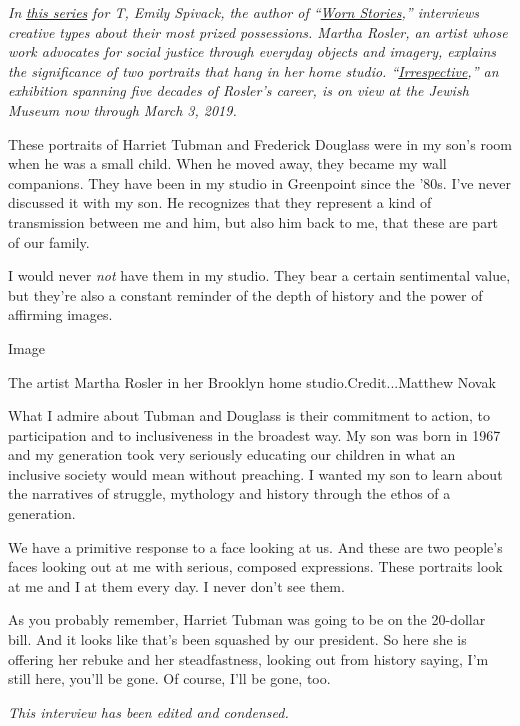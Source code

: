 \emph{In}
\href{https://www.nytimes3xbfgragh.onion/column/story-of-a-thing}{\emph{this
series}} \emph{for T, Emily Spivack, the author of
``}\href{http://wornstories.com/}{\emph{Worn Stories}}\emph{,''
interviews creative types about their most prized possessions. Martha
Rosler, an artist whose work advocates for social justice through
everyday objects and imagery, explains the significance of two portraits
that hang in her home studio.
``}\href{https://thejewishmuseum.org/index.php/exhibitions/martha-rosler-irrespective}{\emph{Irrespective}}\emph{,''
an exhibition spanning five decades of Rosler's career, is on view at
the Jewish Museum now through March 3, 2019.}

These portraits of Harriet Tubman and Frederick Douglass were in my
son's room when he was a small child. When he moved away, they became my
wall companions. They have been in my studio in Greenpoint since the
'80s. I've never discussed it with my son. He recognizes that they
represent a kind of transmission between me and him, but also him back
to me, that these are part of our family.

I would never \emph{not} have them in my studio. They bear a certain
sentimental value, but they're also a constant reminder of the depth of
history and the power of affirming images.

Image

The artist Martha Rosler in her Brooklyn home studio.Credit...Matthew
Novak

What I admire about Tubman and Douglass is their commitment to action,
to participation and to inclusiveness in the broadest way. My son was
born in 1967 and my generation took very seriously educating our
children in what an inclusive society would mean without preaching. I
wanted my son to learn about the narratives of struggle, mythology and
history through the ethos of a generation.

We have a primitive response to a face looking at us. And these are two
people's faces looking out at me with serious, composed expressions.
These portraits look at me and I at them every day. I never don't see
them.

As you probably remember, Harriet Tubman was going to be on the
20-dollar bill. And it looks like that's been squashed by our president.
So here she is offering her rebuke and her steadfastness, looking out
from history saying, I'm still here, you'll be gone. Of course, I'll be
gone, too.

\emph{This interview has been edited and condensed.}

